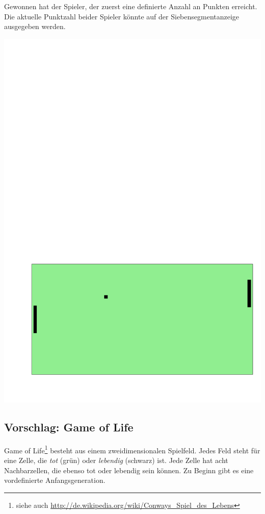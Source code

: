 Gewonnen hat der Spieler, der zuerst eine definierte Anzahl an Punkten erreicht.
Die aktuelle Punktzahl beider Spieler könnte auf der Siebensegmentanzeige ausgegeben werden.
\begin{center}
\includegraphics[scale=0.4]{figures/pong}
\end{center}



\subsection*{Vorschlag: Game of Life}
\glqq{}Game of Life\grqq{}\footnote{siehe auch \url{http://de.wikipedia.org/wiki/Conways_Spiel_des_Lebens}} besteht aus einem zweidimensionalen Spielfeld.
Jedes Feld steht für eine Zelle, die \textit{tot} (grün) oder \textit{lebendig} (schwarz) ist.
Jede Zelle hat acht Nachbarzellen, die ebenso tot oder lebendig sein können.
Zu Beginn gibt es eine vordefinierte Anfangsgeneration.


